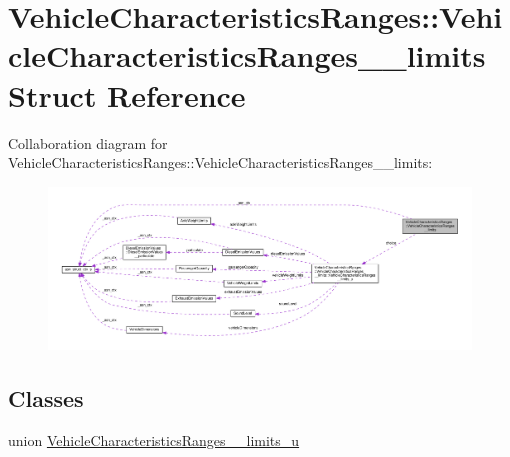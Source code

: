 \hypertarget{structVehicleCharacteristicsRanges_1_1VehicleCharacteristicsRanges____limits}{}\section{Vehicle\+Characteristics\+Ranges\+:\+:Vehicle\+Characteristics\+Ranges\+\_\+\+\_\+limits Struct Reference}
\label{structVehicleCharacteristicsRanges_1_1VehicleCharacteristicsRanges____limits}


Collaboration diagram for Vehicle\+Characteristics\+Ranges\+:\+:Vehicle\+Characteristics\+Ranges\+\_\+\+\_\+limits\+:\nopagebreak
\begin{figure}[H]
\begin{center}
\leavevmode
\includegraphics[width=350pt]{structVehicleCharacteristicsRanges_1_1VehicleCharacteristicsRanges____limits__coll__graph}
\end{center}
\end{figure}
\subsection*{Classes}
\begin{DoxyCompactItemize}
\item 
union \hyperlink{unionVehicleCharacteristicsRanges_1_1VehicleCharacteristicsRanges____limits_1_1VehicleCharacteristicsRanges____limits__u}{Vehicle\+Characteristics\+Ranges\+\_\+\+\_\+limits\+\_\+u}
\end{DoxyCompactItemize}
